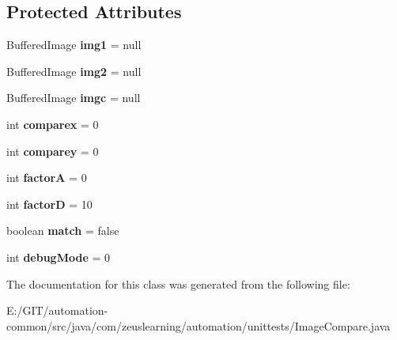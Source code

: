 \subsection*{Protected Attributes}
\begin{DoxyCompactItemize}
\item 
\hypertarget{classcom_1_1zeuslearning_1_1automation_1_1unittests_1_1ImageCompare_ae31dc4e356ca7b0c4ebab624e2f0189a}{}\label{classcom_1_1zeuslearning_1_1automation_1_1unittests_1_1ImageCompare_ae31dc4e356ca7b0c4ebab624e2f0189a} 
Buffered\+Image {\bfseries img1} = null
\item 
\hypertarget{classcom_1_1zeuslearning_1_1automation_1_1unittests_1_1ImageCompare_aedb846ed302a99d64eb4f56d5952ac70}{}\label{classcom_1_1zeuslearning_1_1automation_1_1unittests_1_1ImageCompare_aedb846ed302a99d64eb4f56d5952ac70} 
Buffered\+Image {\bfseries img2} = null
\item 
\hypertarget{classcom_1_1zeuslearning_1_1automation_1_1unittests_1_1ImageCompare_abbb593565f49c68208179d893535e29d}{}\label{classcom_1_1zeuslearning_1_1automation_1_1unittests_1_1ImageCompare_abbb593565f49c68208179d893535e29d} 
Buffered\+Image {\bfseries imgc} = null
\item 
\hypertarget{classcom_1_1zeuslearning_1_1automation_1_1unittests_1_1ImageCompare_acffd88d2395c293d976571bf7958fad0}{}\label{classcom_1_1zeuslearning_1_1automation_1_1unittests_1_1ImageCompare_acffd88d2395c293d976571bf7958fad0} 
int {\bfseries comparex} = 0
\item 
\hypertarget{classcom_1_1zeuslearning_1_1automation_1_1unittests_1_1ImageCompare_a7c3d1099655b0e9d8a9d37fa9b1776df}{}\label{classcom_1_1zeuslearning_1_1automation_1_1unittests_1_1ImageCompare_a7c3d1099655b0e9d8a9d37fa9b1776df} 
int {\bfseries comparey} = 0
\item 
\hypertarget{classcom_1_1zeuslearning_1_1automation_1_1unittests_1_1ImageCompare_a70f87ac9d916f45f4f129cdae2839e14}{}\label{classcom_1_1zeuslearning_1_1automation_1_1unittests_1_1ImageCompare_a70f87ac9d916f45f4f129cdae2839e14} 
int {\bfseries factorA} = 0
\item 
\hypertarget{classcom_1_1zeuslearning_1_1automation_1_1unittests_1_1ImageCompare_a923607933260117c1e7ef230c32662b5}{}\label{classcom_1_1zeuslearning_1_1automation_1_1unittests_1_1ImageCompare_a923607933260117c1e7ef230c32662b5} 
int {\bfseries factorD} = 10
\item 
\hypertarget{classcom_1_1zeuslearning_1_1automation_1_1unittests_1_1ImageCompare_a94f6904a32f36ab98437bc6cb3eb82a7}{}\label{classcom_1_1zeuslearning_1_1automation_1_1unittests_1_1ImageCompare_a94f6904a32f36ab98437bc6cb3eb82a7} 
boolean {\bfseries match} = false
\item 
\hypertarget{classcom_1_1zeuslearning_1_1automation_1_1unittests_1_1ImageCompare_a58db8fcd22d2f1a044bddb5705d844f8}{}\label{classcom_1_1zeuslearning_1_1automation_1_1unittests_1_1ImageCompare_a58db8fcd22d2f1a044bddb5705d844f8} 
int {\bfseries debug\+Mode} = 0
\end{DoxyCompactItemize}


The documentation for this class was generated from the following file\+:\begin{DoxyCompactItemize}
\item 
E\+:/\+G\+I\+T/automation-\/common/src/java/com/zeuslearning/automation/unittests/Image\+Compare.\+java\end{DoxyCompactItemize}
